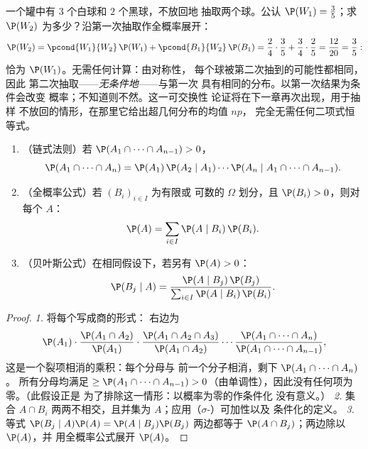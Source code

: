 \begin{example}\label{ex:b2:proba:seconddraw}
一个罐中有 $3$ 个白球和 $2$ 个黑球，不放回地
抽取两个球。公认 $\P(W_1) = \frac35$；求
$\P(W_2)$ 为多少？沿第一次抽取作全概率展开：
\[
\P(W_2) = \pcond{W_1}{W_2}\,\P(W_1) +
\pcond{B_1}{W_2}\,\P(B_1)
= \frac24\cdot\frac35 + \frac34\cdot\frac25
= \frac{12}{20} = \frac35 :
\]
恰为 $\P(W_1)$。无需任何计算：由对称性，
每个球被第二次抽到的可能性都相同，因此
第二次抽取——\emph{无条件地}——与第一次
具有相同的分布。以第一次结果为条件会改变
概率；不知道则不然。这一可交换性
论证将在下一章再次出现，用于抽样
不放回的情形，在那里它给出超几何分布的均值 $np$，
完全无需任何二项式恒等式。
\end{example}

\begin{theorem}\label{thm:b2:proba:bayes}
\leavevmode
\begin{enumerate}
\item （链式法则）若 $\P(A_1 \cap \dots \cap A_{n-1}) > 0$，
\[
\P(A_1 \cap \dots \cap A_n)
= \P(A_1)\,\P(A_2 \mid A_1)\cdots
\P(A_n \mid A_1 \cap \dots \cap A_{n-1}) .
\]
\item （全概率公式）若 $(B_i)_{i \in I}$ 为有限或
可数的 $\Omega$ 划分，且 $\P(B_i) > 0$，则对每个
 $A$：
\[
\P(A) = \sum_{i \in I} \P(A \mid B_i)\,\P(B_i) .
\]
\item （贝叶斯公式）在相同假设下，若另有 $\P(A) > 0$：
\[
\P(B_j \mid A)
= \frac{\P(A \mid B_j)\,\P(B_j)}
       {\sum_{i \in I} \P(A \mid B_i)\,\P(B_i)} .
\]
\end{enumerate}
\end{theorem}

\begin{proof}
\emph{1.} 将每个写成商的形式：
右边为
\[
\P(A_1)\cdot\frac{\P(A_1 \cap A_2)}{\P(A_1)}\cdot
\frac{\P(A_1 \cap A_2 \cap A_3)}{\P(A_1 \cap A_2)}\cdots
\frac{\P(A_1 \cap \dots \cap A_n)}{\P(A_1 \cap \dots \cap
A_{n-1})},
\]
这是一个裂项相消的乘积：每个分母与
前一个分子相消，剩下 $\P(A_1 \cap \dots \cap A_n)$。
所有分母均满足 $\geq \P(A_1 \cap \dots \cap A_{n-1}) >
0$（由单调性），因此没有任何项为零。（此假设正是
为了排除这一情形：以概率为零的作条件化
没有意义。）
\emph{2.} 集合 $A \cap B_i$ 两两不相交，且并集为
$A$；应用（$\sigma$-）可加性以及
条件化的定义。
\emph{3.} 等式 $\P(B_j \mid A)\P(A) = \P(A \mid
B_j)\P(B_j)$ 两边都等于 $\P(A \cap B_j)$；两边除以 $\P(A)$，并
用全概率公式展开 $\P(A)$。
\end{proof}

